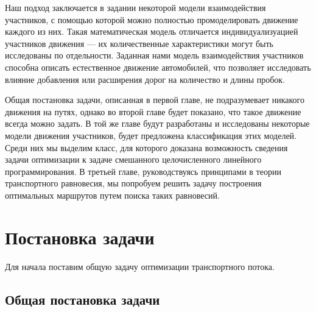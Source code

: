 \documentclass[12pt, a4paper]{article}
\begin{document}
Наш подход заключается в задании некоторой модели взаимодействия участников, с помощью которой можно полностью промоделировать движение каждого из них. Такая математическая модель отличается индивидуализуацией участников движения --- их количественные характеристики могут быть исследованы по отдельности. Заданная нами модель взаимодействия участников способна описать естественное движение автомобилей, что позволяет исследовать влияние добавления или расширения дорог на количество и длины пробок.

Общая постановка задачи, описанная в первой главе, не подразумевает никакого движения на путях, однако во второй главе будет показано, что такое движение всегда можно задать.
В той же главе будут разработаны и исследованы некоторые модели движения участников, будет предложена классификация этих моделей. Среди них мы выделим класс, для которого доказана возможность сведения задачи оптимизации к задаче смешанного целочисленного линейного программирования. В третьей главе, руководствуясь принципами в теории транспортного равновесия, мы попробуем решить задачу построения оптимальных маршрутов путем поиска таких равновесий.

\newpage
\section{Постановка задачи}

Для начала поставим общую задачу оптимизации транспортного потока.


\subsection{Общая постановка задачи}
\end{document}
